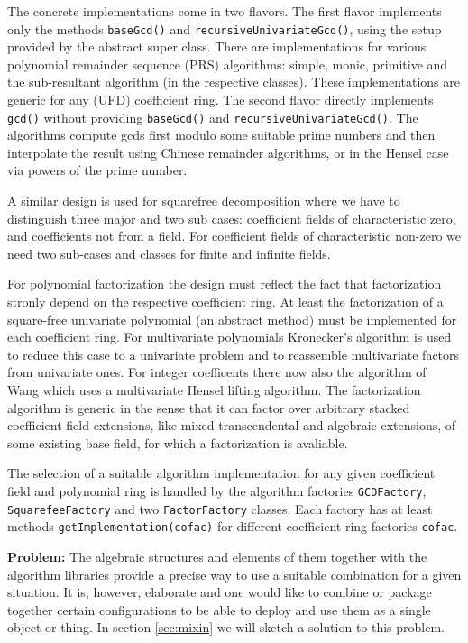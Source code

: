 \documentclass{llncs}
\newcommand{\code}[1]{\texttt{#1}}
\begin{document}
The concrete implementations come in two flavors.  The first flavor
implements only the methods \code{base\-Gcd()} and
\code{recursive\-Univariate\-Gcd()}, using the setup provided by the
abstract super class.  There are implementations for various
polynomial remainder sequence (PRS) algorithms: simple, monic,
primitive and the sub-resultant algorithm (in the respective classes).
These implementations are generic for any (UFD) coefficient ring.  The
second flavor directly implements \code{gcd()} without providing
\code{base\-Gcd()} and \code{recursive\-Univariate\-Gcd()}.  The
algorithms compute gcds first modulo some suitable prime numbers and
then interpolate the result using Chinese remainder algorithms, or in
the Hensel case via powers of the prime number.  

A similar design is used for squarefree decomposition where we have to
distinguish three major and two sub cases: coefficient fields of
characteristic zero, and coefficients not from a field. For
coefficient fields of characteristic non-zero we need two sub-cases
and classes for finite and infinite fields.

For polynomial factorization the design must reflect the fact that
factorization stronly depend on the respective coefficient ring.  At
least the factorization of a square-free univariate polynomial (an
abstract method) must be implemented for each coefficient ring.  For
multivariate polynomials Kronecker's algorithm is used to reduce this
case to a univariate problem and to reassemble multivariate factors
from univariate ones. For integer coefficents there now also the
algorithm of Wang which uses a multivariate Hensel lifting algorithm.
The factorization algorithm is generic in the sense that it can factor
over arbitrary stacked coefficient field extensions, like mixed
transcendental and algebraic extensions, of some existing base field,
for which a factorization is avaliable.

The selection of a suitable algorithm implementation for any given
coefficient field and polynomial ring is handled by the
algorithm factories \code{GCD\-Factory}, \code{Squarefee\-Factory} and
two \code{Factor\-Factory} classes. Each factory has at least methods
\code{get\-Implemen\-tation(cofac)} for different coefficient ring
factories \code{cofac}.

{\bf Problem:} The algebraic structures and elements of them together
with the algorithm libraries provide a precise way to use a suitable
combination for a given situation. It is, however, elaborate and one
would like to combine or package together certain configurations to be
able to deploy and use them as a single object or thing. In section
\ref{sec:mixin} we will sketch a solution to this problem.
\end{document}

